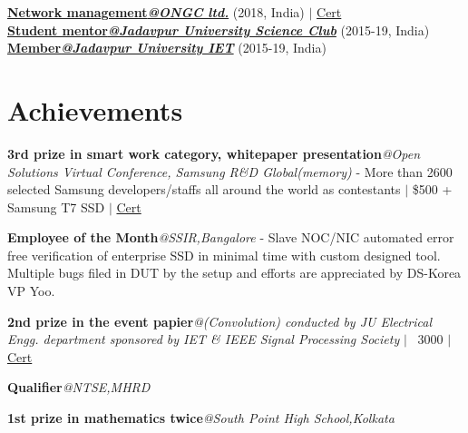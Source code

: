 \documentclass[letterpaper,11pt]{article}
\begin{document}
\begin{itemize}[leftmargin=0.15in, label={}]
{{        \textbf{\href{https://www.ongcindia.com/wps/wcm/connect/en/home/}{\footnotesize Network management\textnormal {\textit {@ONGC ltd.}}}}{ (\footnotesize 2018, India)} $|$ {\href{https://drive.google.com/file/d/1QZdwFRIHp5rP-cmN1gJQ7Tx2KEFUjnqg/view}{\scriptsize
        \color{blue}Cert}}  \\
        
        \textbf{\href{https://www.jusc.in/}{\footnotesize Student mentor\textnormal {\textit {@Jadavpur University Science Club}}}}{ (\footnotesize 2015-19, India)} \\
        
        \textbf{\href{https://www.facebook.com/pg/IET.JU.On.Campus/posts/}{\footnotesize Member\textnormal {\textit {@Jadavpur University IET}}}}{ (\footnotesize 2015-19, India)} \\
     }}
 \end{itemize}



%
\section{Achievements}
 \begin{itemize}[leftmargin=0.15in]
    \small{
     \item{
     \textbf{\footnotesize 3rd prize in smart work category, whitepaper presentation}{\textit{\footnotesize @Open Solutions Virtual Conference, Samsung R\&D Global(memory)}} \footnotesize- More than 2600 selected Samsung developers/staffs all around the world as contestants $|$ \$500 + Samsung T7 SSD $|$ {\href{https://drive.google.com/drive/u/1/folders/1r8ccSlHbASb0m3f7x-lZKThSCp7RLJgy}{{\color{blue}\footnotesize Cert}}} 
     
     \item{\textbf{Employee of the Month}{\textit{@SSIR,Bangalore}} - Slave NOC/NIC automated error free verification of enterprise SSD in minimal time with custom designed tool. Multiple bugs filed in DUT by the setup and efforts are appreciated by DS-Korea VP Yoo.} 
     
     \item{\textbf{2nd prize in the event papier}{\textit{@(Convolution) conducted by JU Electrical Engg. department sponsored by IET \& IEEE Signal Processing Society}} $|$ \rupee~3000 $|$ {\href{https://github.com/Soham-coder/ecc_vs_rsa#prizes}{{\color{blue}\footnotesize Cert}}}}
     
     \item{\textbf{Qualifier}{\textit{@NTSE,MHRD}}}
     \item{\textbf{1st prize in mathematics twice}{\textit{@South Point High School,Kolkata}}}
    }}
 \end{itemize}
%
\end{document}
